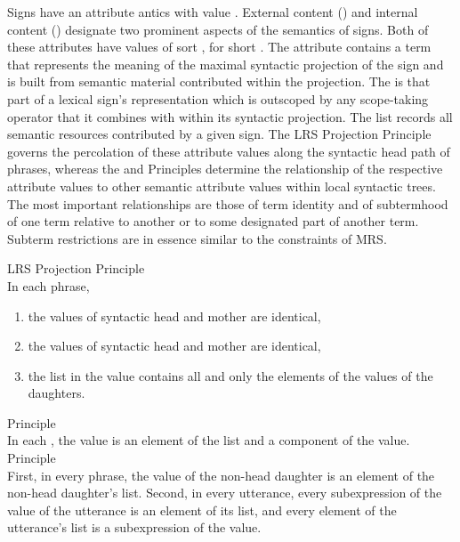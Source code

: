 \documentclass[output=paper
	        ,collection
	        ,collectionchapter
 	        ,biblatex
                ,babelshorthands
                ,newtxmath
                ,draftmode
                ,colorlinks, citecolor=brown
]{langscibook}
\begin{document}
Signs have an attribute antics with value
. External content () and internal content
() designate two prominent aspects of the semantics of
signs. Both of these attributes have
values of sort , for short
. The attribute  contains a term
that represents the meaning of the maximal syntactic projection of the sign
and is built from semantic material contributed within the projection. The
 is that part of a lexical sign's representation which is
outscoped by any scope-taking operator that it combines with within
its syntactic projection. The  list records all semantic
resources contributed by a given sign. The LRS Projection Principle
governs the percolation of these attribute values along the syntactic
head path of phrases, whereas the  and 
Principles determine the relationship of the respective attribute
values to other semantic attribute values within local syntactic
trees. The most important relationships are those of term identity and
of subtermhood of one term relative to another or to some designated part
of another term. Subterm restrictions are in essence similar
to the  constraints of MRS.

\begin{exe}
  \ex\label{lrs-essent-principles}
  \begin{xlist}
    \ex\label{lrs-projection} LRS Projection Principle\\
    In each phrase,
    \begin{enumerate}
    \item the  values of syntactic head and mother are identical,
    \item the  values of syntactic head and mother are identical,
    \item the list in the  value contains all and only the elements
    of the  values of the daughters.
    \end{enumerate}
    \ex\label{lrs-incont}  Principle\\
    In each , the  value is an element of the
     list and a component of the  value.
    \ex\label{lrs-excont}  Principle\\
    First, in every phrase, the  value of the non-head daughter
    is an element of the non-head daughter's  list. Second, in
    every utterance, every subexpression of the  value of the
    utterance is an element of its  list, and every element of
    the utterance's  list is a subexpression of the 
    value.
  \end{xlist}
\end{exe}
\end{document}
